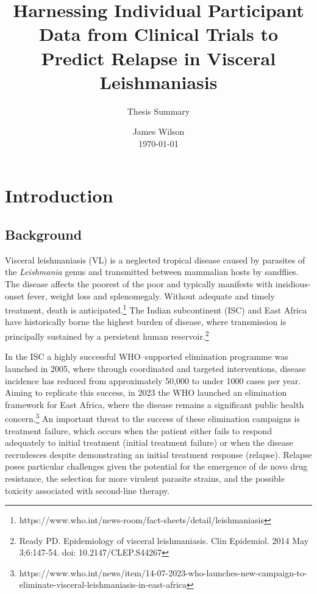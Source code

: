 \documentclass[11pt,a4paper]{article}
\title{\textbf{Harnessing Individual Participant Data from Clinical Trials to Predict Relapse in Visceral Leishmaniasis}}
\author{Thesis Summary}
\date{James Wilson\\\today}  %
\begin{document}
\maketitle


\section*{Introduction}

\subsection*{Background}

Visceral leishmaniasis (VL) is a neglected tropical disease caused by parasites of the \textit{Leishmania} genus and transmitted between mammalian hosts by sandflies. The disease affects the poorest of the poor and typically manifests with insidious-onset fever, weight loss and splenomegaly. Without adequate and timely treatment, death is anticipated.\footnote{https://www.who.int/news-room/fact-sheets/detail/leishmaniasis} The Indian subcontinent (ISC) and East Africa have historically borne the highest burden of disease, where transmission is principally sustained by a persistent human reservoir.\footnote{Ready PD. Epidemiology of visceral leishmaniasis. Clin Epidemiol. 2014 May 3;6:147-54. doi: 10.2147/CLEP.S44267}

In the ISC a highly successful WHO--supported elimination programme was launched in 2005, where through coordinated and targeted interventions, disease incidence has reduced from approximately 50,000 to under 1000 cases per year. Aiming to replicate this success, in 2023 the WHO launched an elimination framework for East Africa, where the disease remains a significant public health concern.\footnote{https://www.who.int/news/item/14-07-2023-who-launches-new-campaign-to-eliminate-visceral-leishmaniasis-in-east-africa} An important threat to the success of these elimination campaigns is treatment failure, which occurs when the patient either fails to respond adequately to initial treatment (initial treatment failure) or when the disease recrudesces despite demonstrating an initial treatment response (relapse). Relapse poses particular challenges given the potential for the emergence of de novo drug resistance, the selection for more virulent parasite strains, and the possible toxicity associated with second-line therapy.
\end{document}
